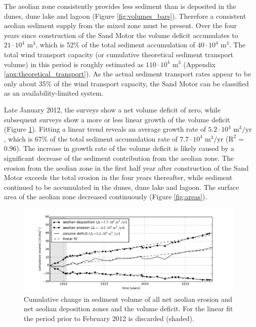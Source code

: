 The aeolian zone consistently provides less sediment than is deposited
in the dunes, dune lake and lagoon (Figure
\ref{fig:volumes_bars}). Therefore a consistent aeolian sediment
supply from the mixed zone must be present. Over the four years since
construction of the Sand Motor the volume deficit accumulates to
$\mathrm{21 \cdot 10^4}$ $\mathrm{m^3}$, which is 52\% of the total
sediment accumulation of $\mathrm{40 \cdot 10^4}$ $\mathrm{m^3}$. The
total wind transport capacity (or cumulative theoretical sediment
transport volume) in this period is roughly estimated as
$\mathrm{110 \cdot 10^4}$ $\mathrm{m^3}$ (Appendix
\ref{apx:theoretical_transport}). As the actual sediment transport
rates appear to be only about 35\% of the wind transport capacity, the
Sand Motor can be classified as an availability-limited system.

Late January 2012, the surveys show a net volume deficit of zero,
while subsequent surveys show a more or less linear growth of the
volume deficit (Figure \ref{fig:netvolumechange}). Fitting a linear
trend reveals an average growth rate of $\mathrm{5.2 \cdot 10^4}$
$\mathrm{m^3/yr}$, which is 67\% of the total sediment accumulation
rate of $\mathrm{7.7 \cdot 10^4}$ $\mathrm{m^3/yr}$ ($\mathrm{R^2}$ =
0.96). The increase in growth rate of the volume deficit is likely
caused by a significant decrease of the sediment contribution from the
aeolian zone. The erosion from the aeolian zone in the first half year
after construction of the Sand Motor exceeds the total erosion in the
four years thereafter, while sediment continued to be accumulated in
the dunes, dune lake and lagoon. The surface area of the aeolian zone
decreased continuously (Figure \ref{fig:areas}).

\begin{figure}
 \centering
  \includegraphics[width=\columnwidth]{../Figures/netvolumechange}
  \caption{Cumulative change in sediment volume of all net aeolian
    erosion and net aeolian deposition zones and the volume
    deficit. For the linear fit the period prior to February 2012 is
    discarded (shaded).}
  \label{fig:netvolumechange}
\end{figure}

